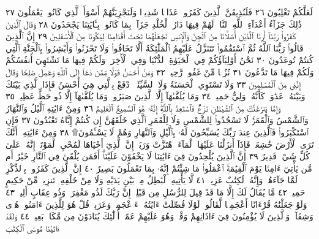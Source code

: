 لَعَلَّكُمْ تَغْلِبُونَ ٢٦ فَلَنُذِيقَنَّ ٱلَّذِينَ كَفَرُوا۟ عَذَابࣰا شَدِيدࣰا
وَلَنَجْزِيَنَّهُمْ أَسْوَأَ ٱلَّذِي كَانُوا۟ يَعْمَلُونَ ٢٧ ذَٰلِكَ جَزَآءُ أَعْدَآءِ ٱللَّهِ
ٱلنَّارُۖ لَهُمْ فِيهَا دَارُ ٱلْخُلْدِ جَزَآءَۢ بِمَا كَانُوا۟ بِـَٔايَٰتِنَا يَجْحَدُونَ ٢٨
وَقَالَ ٱلَّذِينَ كَفَرُوا۟ رَبَّنَآ أَرِنَا ٱلَّذَيْنِ أَضَلَّانَا مِنَ ٱلْجِنِّ
وَٱلْإِنسِ نَجْعَلْهُمَا تَحْتَ أَقْدَامِنَا لِيَكُونَا مِنَ ٱلْأَسْفَلِينَ ٢٩
إِنَّ ٱلَّذِينَ قَالُوا۟ رَبُّنَا ٱللَّهُ ثُمَّ ٱسْتَقَٰمُوا۟ تَتَنَزَّلُ عَلَيْهِمُ
ٱلْمَلَٰٓئِكَةُ أَلَّا تَخَافُوا۟ وَلَا تَحْزَنُوا۟ وَأَبْشِرُوا۟ بِٱلْجَنَّةِ
ٱلَّتِي كُنتُمْ تُوعَدُونَ ٣٠ نَحْنُ أَوْلِيَآؤُكُمْ فِي ٱلْحَيَوٰةِ ٱلدُّنْيَا
وَفِي ٱلْأٓخِرَةِۖ وَلَكُمْ فِيهَا مَا تَشْتَهِيٓ أَنفُسُكُمْ وَلَكُمْ
فِيهَا مَا تَدَّعُونَ ٣١ نُزُلࣰا مِّنْ غَفُورࣲ رَّحِيمࣲ ٣٢ وَمَنْ أَحْسَنُ
قَوْلࣰا مِّمَّن دَعَآ إِلَى ٱللَّهِ وَعَمِلَ صَٰلِحࣰا وَقَالَ إِنَّنِي مِنَ
ٱلْمُسْلِمِينَ ٣٣ وَلَا تَسْتَوِي ٱلْحَسَنَةُ وَلَا ٱلسَّيِّئَةُۚ ٱدْفَعْ
بِٱلَّتِي هِيَ أَحْسَنُ فَإِذَا ٱلَّذِي بَيْنَكَ وَبَيْنَهُۥ عَدَٰوَةࣱ كَأَنَّهُۥ
وَلِيٌّ حَمِيمࣱ ٣٤ وَمَا يُلَقَّىٰهَآ إِلَّا ٱلَّذِينَ صَبَرُوا۟ وَمَا يُلَقَّىٰهَآ
إِلَّا ذُو حَظٍّ عَظِيمࣲ ٣٥ وَإِمَّا يَنزَغَنَّكَ مِنَ ٱلشَّيْطَٰنِ نَزْغࣱ
فَٱسْتَعِذْ بِٱللَّهِۖ إِنَّهُۥ هُوَ ٱلسَّمِيعُ ٱلْعَلِيمُ ٣٦ وَمِنْ ءَايَٰتِهِ
ٱلَّيْلُ وَٱلنَّهَارُ وَٱلشَّمْسُ وَٱلْقَمَرُۚ لَا تَسْجُدُوا۟ لِلشَّمْسِ
وَلَا لِلْقَمَرِ  ٱلَّذِي خَلَقَهُنَّ إِن كُنتُمْ
إِيَّاهُ تَعْبُدُونَ ٣٧ فَإِنِ ٱسْتَكْبَرُوا۟ فَٱلَّذِينَ عِندَ
رَبِّكَ يُسَبِّحُونَ لَهُۥ بِٱلَّيْلِ وَٱلنَّهَارِ وَهُمْ لَا يَسْـَٔمُونَ۩ ٣٨
وَمِنْ ءَايَٰتِهِۦٓ أَنَّكَ تَرَى ٱلْأَرْضَ خَٰشِعَةࣰ فَإِذَآ أَنزَلْنَا عَلَيْهَا ٱلْمَآءَ
ٱهْتَزَّتْ وَرَبَتْۚ إِنَّ ٱلَّذِيٓ أَحْيَاهَا لَمُحْيِ ٱلْمَوْتَىٰٓۚ إِنَّهُۥ عَلَىٰ كُلِّ شَيْءࣲ
قَدِيرٌ ٣٩ إِنَّ ٱلَّذِينَ يُلْحِدُونَ فِيٓ ءَايَٰتِنَا لَا يَخْفَوْنَ عَلَيْنَآۗ أَفَمَن
يُلْقَىٰ فِي ٱلنَّارِ خَيْرٌ أَم مَّن يَأْتِيٓ ءَامِنࣰا يَوْمَ ٱلْقِيَٰمَةِۚ ٱعْمَلُوا۟ مَا شِئْتُمْ
إِنَّهُۥ بِمَا تَعْمَلُونَ بَصِيرٌ ٤٠ إِنَّ ٱلَّذِينَ كَفَرُوا۟ بِٱلذِّكْرِ لَمَّا جَآءَهُمْۖ
وَإِنَّهُۥ لَكِتَٰبٌ عَزِيزࣱ ٤١ لَّا يَأْتِيهِ ٱلْبَٰطِلُ مِنۢ بَيْنِ يَدَيْهِ وَلَا مِنْ
خَلْفِهِۦۖ تَنزِيلࣱ مِّنْ حَكِيمٍ حَمِيدࣲ ٤٢ مَّا يُقَالُ لَكَ إِلَّا مَا قَدْ قِيلَ
لِلرُّسُلِ مِن قَبْلِكَۚ إِنَّ رَبَّكَ لَذُو مَغْفِرَةࣲ وَذُو عِقَابٍ أَلِيمࣲ ٤٣
وَلَوْ جَعَلْنَٰهُ قُرْءَانًا أَعْجَمِيࣰّا لَّقَالُوا۟ لَوْلَا فُصِّلَتْ ءَايَٰتُهُۥٓۖ
ءَا۬عْجَمِيࣱّ وَعَرَبِيࣱّۗ قُلْ هُوَ لِلَّذِينَ ءَامَنُوا۟ هُدࣰى وَشِفَآءࣱۚ وَٱلَّذِينَ
لَا يُؤْمِنُونَ فِيٓ ءَاذَانِهِمْ وَقْرࣱ وَهُوَ عَلَيْهِمْ عَمًىۚ أُو۟لَٰٓئِكَ
يُنَادَوْنَ مِن مَّكَانِۭ بَعِيدࣲ ٤٤ وَلَقَدْ ءَاتَيْنَا مُوسَى ٱلْكِتَٰبَ
